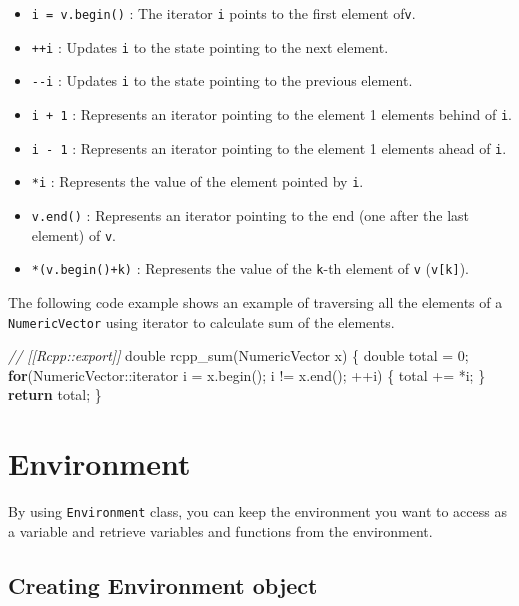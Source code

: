 \documentclass[]{book}
\newenvironment{Shaded}{\begin{snugshade}}{\end{snugshade}}
\newcommand{\CommentTok}[1]{\textcolor[rgb]{0.56,0.35,0.01}{\textit{#1}}}
\newcommand{\ControlFlowTok}[1]{\textcolor[rgb]{0.13,0.29,0.53}{\textbf{#1}}}
\newcommand{\DataTypeTok}[1]{\textcolor[rgb]{0.13,0.29,0.53}{#1}}
\newcommand{\DecValTok}[1]{\textcolor[rgb]{0.00,0.00,0.81}{#1}}
\newcommand{\NormalTok}[1]{#1}
\providecommand{\tightlist}{%
  \setlength{\itemsep}{0pt}\setlength{\parskip}{0pt}}
\begin{document}
\begin{itemize}
\tightlist
\item
  \texttt{i\ =\ v.begin()} : The iterator \texttt{i} points to the first element of\texttt{v}.
\item
  \texttt{++i} : Updates \texttt{i} to the state pointing to the next element.
\item
  \texttt{-\/-i} : Updates \texttt{i} to the state pointing to the previous element.
\item
  \texttt{i\ +\ 1} : Represents an iterator pointing to the element 1 elements behind of \texttt{i}.
\item
  \texttt{i\ -\ 1} : Represents an iterator pointing to the element 1 elements ahead of \texttt{i}.
\item
  \texttt{*i} : Represents the value of the element pointed by \texttt{i}.
\item
  \texttt{v.end()} : Represents an iterator pointing to the end (one after the last element) of \texttt{v}.
\item
  \texttt{*(v.begin()+k)} : Represents the value of the \texttt{k}-th element of \texttt{v} (\texttt{v{[}k{]}}).
\end{itemize}

The following code example shows an example of traversing all the elements of a \texttt{NumericVector} using iterator to calculate sum of the elements.

\begin{Shaded}
\begin{Highlighting}[]
\CommentTok{// [[Rcpp::export]]}
\DataTypeTok{double}\NormalTok{ rcpp_sum(NumericVector x) \{}
  \DataTypeTok{double}\NormalTok{ total = }\DecValTok{0}\NormalTok{;}
  \ControlFlowTok{for}\NormalTok{(NumericVector::iterator i = x.begin(); i != x.end(); ++i) \{}
\NormalTok{    total += *i;}
\NormalTok{  \}}
  \ControlFlowTok{return}\NormalTok{ total;}
\NormalTok{\}}
\end{Highlighting}
\end{Shaded}

\hypertarget{environment-1}{%
\chapter{Environment}\label{environment-1}}

By using \texttt{Environment} class, you can keep the environment you want to access as a variable and retrieve variables and functions from the environment.

\hypertarget{creating-environment-object}{%
\section{Creating Environment object}\label{creating-environment-object}}
\end{document}
